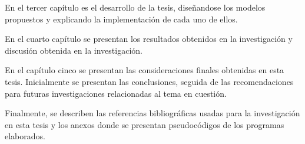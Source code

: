	En el tercer capítulo es el desarrollo de la tesis, diseñandose los modelos propuestos y explicando la implementación de cada uno de ellos.
	
	En el cuarto capítulo se presentan los resultados obtenidos en la investigación y discusión obtenida en la investigación.

	En el capítulo cinco se presentan las consideraciones finales obtenidas en esta tesis. Inicialmente se presentan las conclusiones, seguida de las recomendaciones para futuras investigaciones relacionadas al tema en cuestión.

	Finalmente, se describen las referencias bibliográficas usadas para la investigación en esta tesis y los anexos donde se presentan pseudocódigos de los programas elaborados.

